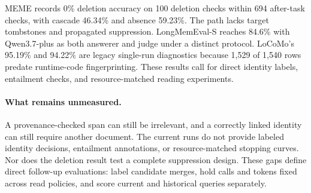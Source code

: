 MEME records 0\% deletion accuracy on 100 deletion checks within 694 after-task checks, with cascade 46.34\% and absence 59.23\%. The path lacks target tombstones and propagated suppression. LongMemEval-S reaches 84.6\% with Qwen3.7-plus as both answerer and judge under a distinct protocol. LoCoMo's 95.19\% and 94.22\% are legacy single-run diagnostics because 1,529 of 1,540 rows predate runtime-code fingerprinting. These results call for direct identity labels, entailment checks, and resource-matched reading experiments.

\paragraph{What remains unmeasured.} A provenance-checked span can still be irrelevant, and a correctly linked identity can still require another document. The current runs do not provide labeled identity decisions, entailment annotations, or resource-matched stopping curves. Nor does the deletion result test a complete suppression design. These gaps define direct follow-up evaluations: label candidate merges, hold calls and tokens fixed across read policies, and score current and historical queries separately.
